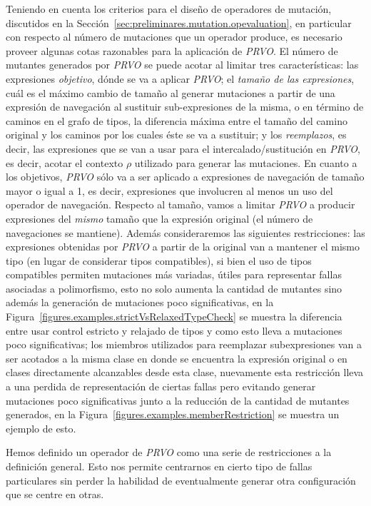 Teniendo en cuenta los criterios para el dise\~no de operadores de mutaci\'on, discutidos en la Secci\'on~\ref{sec:preliminares.mutation.opevaluation}, en particular con respecto al n\'umero de mutaciones que un operador produce, es necesario proveer algunas cotas razonables para la aplicaci\'on de \emph{PRVO}. El n\'umero de mutantes generados por \emph{PRVO} se puede acotar al limitar tres caracter\'isticas: las expresiones \emph{objetivo}, d\'onde se va a aplicar \emph{PRVO}; el \emph{tama\~no de las expresiones}, cu\'al es el m\'aximo cambio de tama\~no al generar mutaciones a partir de una expresi\'on de navegaci\'on al sustituir sub-expresiones de la misma, o en t\'ermino de caminos en el grafo de tipos, la diferencia m\'axima entre el tama\~no del camino original y los caminos por los cuales \'este se va a sustituir; y los \emph{reemplazos}, es decir, las expresiones que se van a usar para el intercalado/sustituci\'on en \emph{PRVO}, es decir, acotar el contexto $\rho$ utilizado para generar las mutaciones. En cuanto a los objetivos, \emph{PRVO} s\'olo va a ser aplicado a expresiones de navegaci\'on de tama\~no mayor o igual a 1, es decir, expresiones que involucren al menos un uso del operador de navegaci\'on. Respecto al tama\~no, vamos a limitar \emph{PRVO} a producir expresiones del \emph{mismo} tama\~no que la expresi\'on original (el n\'umero de navegaciones se mantiene). Adem\'as consideraremos las siguientes restricciones: las expresiones obtenidas por \emph{PRVO} a partir de la original van a mantener el mismo tipo (en lugar de considerar tipos compatibles), si bien el uso de tipos compatibles permiten mutaciones m\'as variadas, \'utiles para representar fallas asociadas a polimorfismo, esto no solo aumenta la cantidad de mutantes sino adem\'as la generaci\'on de mutaciones poco significativas, en la Figura~\ref{figures.examples.strictVsRelaxedTypeCheck} se muestra la diferencia entre usar control estricto y relajado de tipos y como esto lleva a mutaciones poco significativas; los miembros utilizados para reemplazar subexpresiones van a ser acotados a la misma clase en donde se encuentra la expresi\'on original o en clases directamente alcanzables desde esta clase, nuevamente esta restricci\'on lleva a una perdida de representaci\'on de ciertas fallas pero evitando generar mutaciones poco significativas junto a la reducci\'on de la cantidad de mutantes generados, en la Figura~\ref{figures.examples.memberRestriction} se muestra un ejemplo de esto.

Hemos definido un operador de \emph{PRVO} como una serie de restricciones a la definici\'on general. Esto nos permite centrarnos en cierto tipo de fallas particulares sin perder la habilidad de eventualmente generar otra configuraci\'on que se centre en otras.

